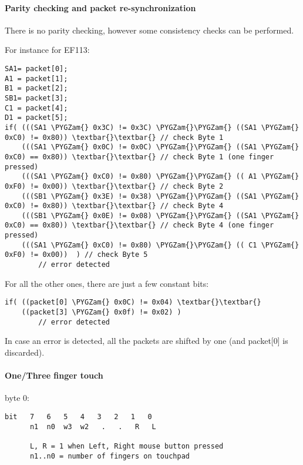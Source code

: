 \documentclass[a4paper,8pt,english]{sphinxmanual}
\def\PYGZam{\char`\&}
\begin{document}
\paragraph{Parity checking and packet re-synchronization}
\label{input/devices/elantech:parity-checking-and-packet-re-synchronization}
There is no parity checking, however some consistency checks can be performed.

For instance for EF113:

\begin{Verbatim}[commandchars=\\\{\}]
SA1= packet[0];
A1 = packet[1];
B1 = packet[2];
SB1= packet[3];
C1 = packet[4];
D1 = packet[5];
if( (((SA1 \PYGZam{} 0x3C) != 0x3C) \PYGZam{}\PYGZam{} ((SA1 \PYGZam{} 0xC0) != 0x80)) \textbar{}\textbar{} // check Byte 1
    (((SA1 \PYGZam{} 0x0C) != 0x0C) \PYGZam{}\PYGZam{} ((SA1 \PYGZam{} 0xC0) == 0x80)) \textbar{}\textbar{} // check Byte 1 (one finger pressed)
    (((SA1 \PYGZam{} 0xC0) != 0x80) \PYGZam{}\PYGZam{} (( A1 \PYGZam{} 0xF0) != 0x00)) \textbar{}\textbar{} // check Byte 2
    (((SB1 \PYGZam{} 0x3E) != 0x38) \PYGZam{}\PYGZam{} ((SA1 \PYGZam{} 0xC0) != 0x80)) \textbar{}\textbar{} // check Byte 4
    (((SB1 \PYGZam{} 0x0E) != 0x08) \PYGZam{}\PYGZam{} ((SA1 \PYGZam{} 0xC0) == 0x80)) \textbar{}\textbar{} // check Byte 4 (one finger pressed)
    (((SA1 \PYGZam{} 0xC0) != 0x80) \PYGZam{}\PYGZam{} (( C1 \PYGZam{} 0xF0) != 0x00))  ) // check Byte 5
        // error detected
\end{Verbatim}

For all the other ones, there are just a few constant bits:

\begin{Verbatim}[commandchars=\\\{\}]
if( ((packet[0] \PYGZam{} 0x0C) != 0x04) \textbar{}\textbar{}
    ((packet[3] \PYGZam{} 0x0f) != 0x02) )
        // error detected
\end{Verbatim}

In case an error is detected, all the packets are shifted by one (and packet{[}0{]} is discarded).


\paragraph{One/Three finger touch}
\label{input/devices/elantech:one-three-finger-touch}
byte 0:

\begin{Verbatim}[commandchars=\\\{\}]
bit   7   6   5   4   3   2   1   0
      n1  n0  w3  w2   .   .   R   L

      L, R = 1 when Left, Right mouse button pressed
      n1..n0 = number of fingers on touchpad
\end{Verbatim}
\end{document}

